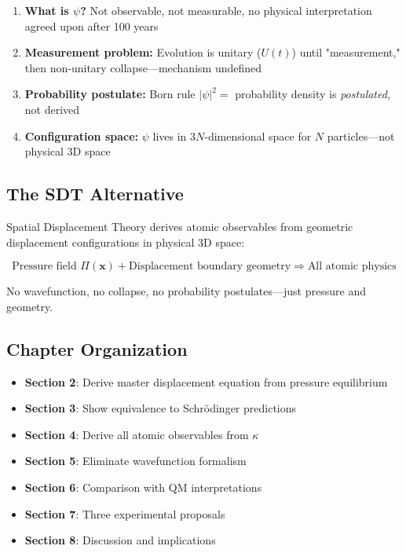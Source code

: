 \begin{enumerate}
\item \textbf{What is $\psi$?} Not observable, not measurable, no physical interpretation agreed upon after 100 years \cite{bell1987speakable}
\item \textbf{Measurement problem:} Evolution is unitary ($U(t)$) until "measurement," then non-unitary collapse—mechanism undefined \cite{zurek2003decoherence}
\item \textbf{Probability postulate:} Born rule $|\psi|^2 = $ probability density is \emph{postulated}, not derived \cite{born1926quantenmechanik}
\item \textbf{Configuration space:} $\psi$ lives in $3N$-dimensional space for $N$ particles—not physical 3D space \cite{norsen2017foundations}
\end{enumerate}

\subsection{The SDT Alternative}

Spatial Displacement Theory derives atomic observables from geometric displacement configurations in physical 3D space:

\begin{equation}
\boxed{\text{Pressure field } \Pi(\mathbf{x}) + \text{Displacement boundary geometry} \Rightarrow \text{All atomic physics}}
\end{equation}

No wavefunction, no collapse, no probability postulates—just pressure and geometry.

\subsection{Chapter Organization}

\begin{itemize}
\item \textbf{Section 2}: Derive master displacement equation from pressure equilibrium
\item \textbf{Section 3}: Show equivalence to Schrödinger predictions
\item \textbf{Section 4}: Derive all atomic observables from $\kappa$
\item \textbf{Section 5}: Eliminate wavefunction formalism
\item \textbf{Section 6}: Comparison with QM interpretations
\item \textbf{Section 7}: Three experimental proposals
\item \textbf{Section 8}: Discussion and implications
\end{itemize}

